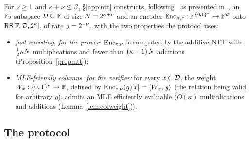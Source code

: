 For $\nu \ge 1$ and $\kappa + \nu \le \beta$, \S\ref{app:ntt} constructs, following~\cite{LCH14} as presented in~\cite{DP26}, an $\mathbb{F}_2$-subspace $\mathcal{D} \subseteq \mathbb{F}$ of size $N = 2^{\kappa+\nu}$ and an encoder $\mathrm{Enc}_{\kappa,\nu} : \mathbb{F}^{\{0,1\}^{\kappa}} \to \mathbb{F}^{\mathcal{D}}$ onto $\mathrm{RS}[\mathbb{F}, \mathcal{D}, 2^{\kappa}]$, of rate $\varrho = 2^{-\nu}$, with the two properties the protocol uses:
\begin{itemize}[itemsep=2pt]
\item \emph{fast encoding, for the prover:} $\mathrm{Enc}_{\kappa,\nu}$ is computed by the additive NTT with $\tfrac12 \kappa N$ multiplications and fewer than $(\kappa + 1)\, N$ additions (Proposition~\ref{prop:ntt});
\item \emph{MLE-friendly columns, for the verifier:} for every $x \in \mathcal{D}$, the weight $W_x : \{0,1\}^{\kappa} \to \mathbb{F}$, defined by $\mathrm{Enc}_{\kappa,\nu}(g)[x] = \langle W_x,\, g \rangle$ (the relation being valid for arbitrary $g$), admits an MLE efficiently evaluable ($O(\kappa)$ multiplications and additions (Lemma~\ref{lem:colweight})).
\end{itemize}

\subsection{The protocol}\label{sec:protocol}

